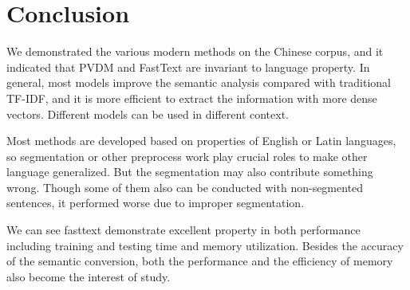 \section{Conclusion}

We demonstrated the various modern methods on the Chinese corpus, and it indicated that PVDM and FastText are invariant to language property. 
In general, most models improve the semantic analysis compared with traditional TF-IDF, and it is more efficient to extract the information with more dense vectors.
Different models can be used in different context.

Most methods are developed based on properties of English or Latin languages, so segmentation or other preprocess work play crucial roles to make other language generalized.
But the segmentation may also contribute something wrong. Though some of them also can be conducted with non-segmented sentences, it performed worse due to improper segmentation.

We can see fasttext demonstrate excellent property in both performance including training and testing time and memory utilization. 
Besides the accuracy of the semantic conversion, both the performance and the efficiency of memory also become the interest of study.

